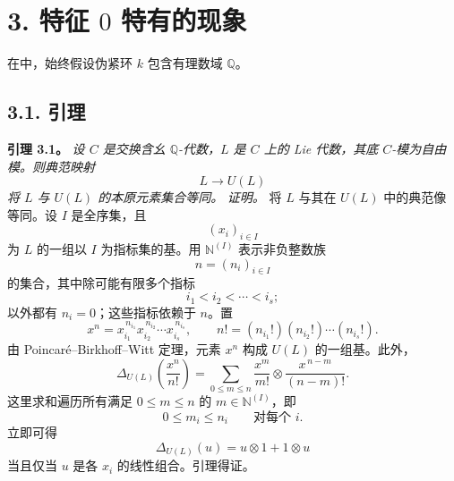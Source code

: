 
\section*{3. 特征 \(0\) 特有的现象}
\label{sga3:VIIB:3}
在中，始终假设伪紧环 \(k\) 包含有理数域 \(\mathbb Q\)。
\subsection*{3.1. 引理}
\label{sga3:VIIB:3.1}
\noindent\textbf{引理 3.1。}
\label{sga3:VIIB:3.1:lemma}
{\itshape 设 \(C\) 是交换含幺 \(\mathbb Q\)-代数，\(L\) 是 \(C\) 上的 Lie 代数，其底 \(C\)-模为自由模。则典范映射
\[
  L\longrightarrow U(L)
\]
将 \(L\) 与 \(U(L)\) 的本原元素集合等同。}
\textit{证明。}
将 \(L\) 与其在 \(U(L)\) 中的典范像等同。设 \(I\) 是全序集，且
\[
  (x_i)_{i\in I}
\]
为 \(L\) 的一组以 \(I\) 为指标集的基。用 \(\mathbb N^{(I)}\) 表示非负整数族
\[
  n=(n_i)_{i\in I}
\]
的集合，其中除可能有限多个指标
\[
  i_1<i_2<\cdots<i_s;
\]
以外都有 \(n_i=0\)；这些指标依赖于 \(n\)。置
\[
  x^n
  =
  x_{i_1}^{\,n_{i_1}}
  x_{i_2}^{\,n_{i_2}}
  \cdots
  x_{i_s}^{\,n_{i_s}},
  \qquad
  n!
  =
  (n_{i_1}!)(n_{i_2}!)\cdots(n_{i_s}!).
\]
由 Poincaré--Birkhoff--Witt 定理，元素 \(x^n\) 构成 \(U(L)\) 的一组基。此外，
\begin{equation}
  \Delta_{U(L)}
  \left(\frac{x^n}{n!}\right)
  =
  \sum_{0\leq m\leq n}
  \frac{x^m}{m!}
  \otimes
  \frac{x^{\,n-m}}{(n-m)!}.
  \tag{*}
  \label{sga3:VIIB:3.1:pbw-comultiplication}
\end{equation}
这里求和遍历所有满足 \(0\leq m\leq n\) 的 \(m\in\mathbb N^{(I)}\)，即
\[
  0\leq m_i\leq n_i
  \qquad\text{对每个 }i.
\]
立即可得
\[
  \Delta_{U(L)}(u)=u\otimes1+1\otimes u
\]
当且仅当 \(u\) 是各 \(x_i\) 的线性组合。引理得证。
